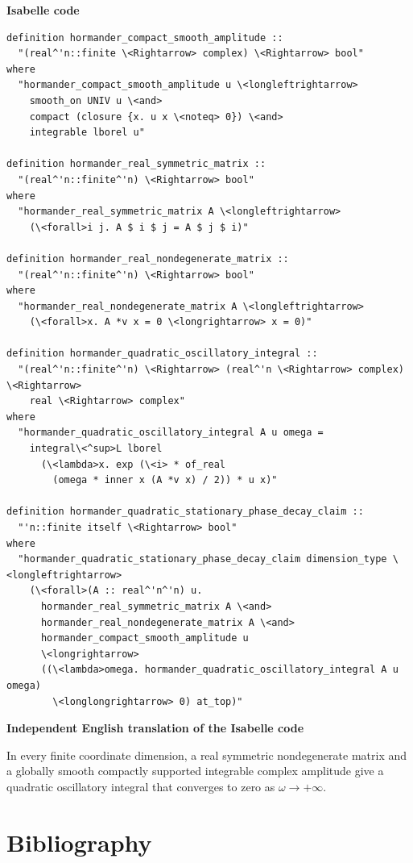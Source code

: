 \documentclass[10pt,oneside]{article}
\newcommand{\reviewlabel}[1]{\par\smallskip\noindent\textsf{\bfseries #1}\par\smallskip}
\begin{document}
\reviewlabel{Isabelle code}
\begin{lstlisting}
definition hormander_compact_smooth_amplitude ::
  "(real^'n::finite \<Rightarrow> complex) \<Rightarrow> bool"
where
  "hormander_compact_smooth_amplitude u \<longleftrightarrow>
    smooth_on UNIV u \<and>
    compact (closure {x. u x \<noteq> 0}) \<and>
    integrable lborel u"

definition hormander_real_symmetric_matrix ::
  "(real^'n::finite^'n) \<Rightarrow> bool"
where
  "hormander_real_symmetric_matrix A \<longleftrightarrow>
    (\<forall>i j. A $ i $ j = A $ j $ i)"

definition hormander_real_nondegenerate_matrix ::
  "(real^'n::finite^'n) \<Rightarrow> bool"
where
  "hormander_real_nondegenerate_matrix A \<longleftrightarrow>
    (\<forall>x. A *v x = 0 \<longrightarrow> x = 0)"

definition hormander_quadratic_oscillatory_integral ::
  "(real^'n::finite^'n) \<Rightarrow> (real^'n \<Rightarrow> complex) \<Rightarrow>
    real \<Rightarrow> complex"
where
  "hormander_quadratic_oscillatory_integral A u omega =
    integral\<^sup>L lborel
      (\<lambda>x. exp (\<i> * of_real
        (omega * inner x (A *v x) / 2)) * u x)"

definition hormander_quadratic_stationary_phase_decay_claim ::
  "'n::finite itself \<Rightarrow> bool"
where
  "hormander_quadratic_stationary_phase_decay_claim dimension_type \<longleftrightarrow>
    (\<forall>(A :: real^'n^'n) u.
      hormander_real_symmetric_matrix A \<and>
      hormander_real_nondegenerate_matrix A \<and>
      hormander_compact_smooth_amplitude u
      \<longrightarrow>
      ((\<lambda>omega. hormander_quadratic_oscillatory_integral A u omega)
        \<longlongrightarrow> 0) at_top)"
\end{lstlisting}

\reviewlabel{Independent English translation of the Isabelle code}
In every finite coordinate dimension, a real symmetric nondegenerate matrix and a globally smooth compactly supported integrable complex amplitude give a quadratic oscillatory integral that converges to zero as $\omega\to+\infty$.

\clearpage
\section{Bibliography}
\end{document}
